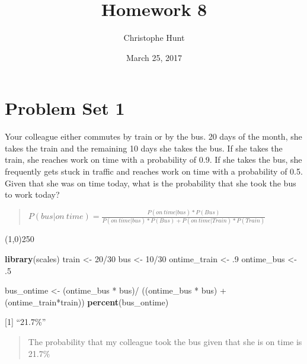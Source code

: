 \documentclass[]{article}
\title{Homework 8}
\author{Christophe Hunt}
\date{March 25, 2017}
\newenvironment{Shaded}{\begin{snugshade}}{\end{snugshade}}
\newcommand{\KeywordTok}[1]{\textcolor[rgb]{0.13,0.29,0.53}{\textbf{{#1}}}}
\newcommand{\DecValTok}[1]{\textcolor[rgb]{0.00,0.00,0.81}{{#1}}}
\newcommand{\StringTok}[1]{\textcolor[rgb]{0.31,0.60,0.02}{{#1}}}
\newcommand{\NormalTok}[1]{{#1}}
\begin{document}
\maketitle

{
\setcounter{tocdepth}{2}
\tableofcontents
}
\section{Problem Set 1}\label{problem-set-1}

Your colleague either commutes by train or by the bus. 20 days of the
month, she takes the train and the remaining 10 days she takes the bus.
If she takes the train, she reaches work on time with a probability of
0.9. If she takes the bus, she frequently gets stuck in traffic and
reaches work on time with a probability of 0.5. Given that she was on
time today, what is the probability that she took the bus to work today?

\begin{quote}
\(P(bus|on~time) = \frac{P(on~time|bus)*P(Bus)}{P(on~time|bus)*P(Bus) + P(on~time|Train)*P(Train)}\)
\end{quote}

\begin{center}
\line(1,0){250}
\end{center}

\begin{Shaded}
\begin{Highlighting}[]
\KeywordTok{library}\NormalTok{(scales)}
\NormalTok{train <-}\StringTok{ }\DecValTok{20}\NormalTok{/}\DecValTok{30}
\NormalTok{bus <-}\StringTok{ }\DecValTok{10}\NormalTok{/}\DecValTok{30}
\NormalTok{ontime_train <-}\StringTok{ }\NormalTok{.}\DecValTok{9}
\NormalTok{ontime_bus <-}\StringTok{ }\NormalTok{.}\DecValTok{5}

\NormalTok{bus_ontime <-}\StringTok{ }\NormalTok{(ontime_bus *}\StringTok{ }\NormalTok{bus)/}\StringTok{ }\NormalTok{((ontime_bus *}\StringTok{ }\NormalTok{bus) +}\StringTok{ }\NormalTok{(ontime_train*train))}
\KeywordTok{percent}\NormalTok{(bus_ontime)}
\end{Highlighting}
\end{Shaded}

{[}1{]} ``21.7\%''

\begin{quote}
The probability that my colleague took the bus given that she is on time
is 21.7\%
\end{quote}

\newpage
\end{document}
